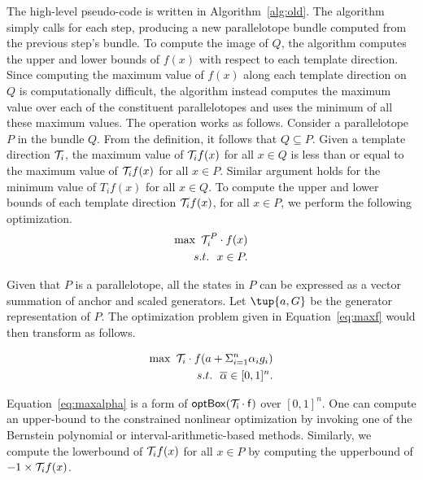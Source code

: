 The high-level pseudo-code is written in Algorithm~\ref{alg:old}.
%
The algorithm simply calls \tbundle for each step, producing a new parallelotope bundle computed from the previous step's bundle.
%
To compute the image of $Q$, the algorithm computes the upper and lower bounds of $f(x)$ with respect to each template direction.
%
Since computing the maximum value of $f(x)$ along each template direction on $Q$ is computationally difficult, the algorithm instead computes the maximum value over each of the constituent parallelotopes and uses the minimum of all these maximum values.
%
The \tbundle operation works as follows.
%
Consider a parallelotope $P$ in the bundle $Q$.
%
From the definition, it follows that $Q \subseteq P$.
%
Given a template direction ${\cal T}_i$, the maximum value of ${\cal T}_{i} f(x)$ for all $x \in Q$ is less than or equal to the maximum value of ${\cal T}_{i} f(x)$ for all $x \in P$.
%
Similar argument holds for the minimum value of $T_{i} f(x)$ for all $x \in Q$.
%
%
%
%
To compute the upper and lower bounds of each template direction ${\cal T}_{i} f(x)$, for all $x \in P$, we perform the following optimization.
%
\begin{eqnarray}
  \max ~ {\cal T}_i^{P} \cdot f(x) \label{eq:maxf}\\
  s.t. ~~ x \in P.\nonumber
\end{eqnarray}

Given that $P$ is a parallelotope, all the states in $P$ can be expressed as a vector summation of anchor and scaled generators.
%
Let  $\tup{a, G}$ be the generator representation of $P$.
%
The optimization problem given in Equation~\ref{eq:maxf} would then transform as follows.

\begin{eqnarray}
  \max ~ {\cal T}_i \cdot f(a + \Sigma_{i=1}^{n} \alpha_i g_i) \label{eq:maxalpha}\\
  s.t. ~~ \overline\alpha \in [0,1]^{n}.\nonumber
\end{eqnarray}

Equation~\ref{eq:maxalpha} is a form of $\mathsf{optBox({\cal T}_{i} \cdot f)}$ over $[0,1]^n$.
%
One can compute an upper-bound to the constrained nonlinear optimization by invoking one of the Bernstein polynomial or interval-arithmetic-based methods.
%
Similarly, we compute the lowerbound of ${\cal T}_{i}f(x)$ for all $x \in P$ by computing the upperbound of $-1 \times {\cal T}_{i}f(x)$.
%

